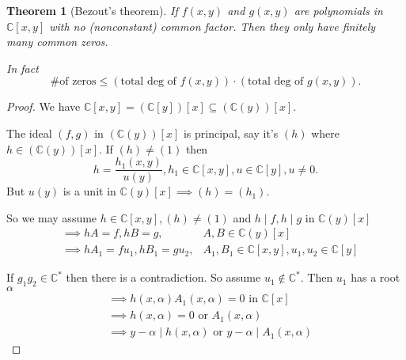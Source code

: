 \documentclass{article}
\newcommand{\C}{\mathbb{C}}
\newtheorem*{theorem}{Theorem}
\theoremstyle{definition}
\theoremstyle{remark}
\begin{document}
\begin{theorem}[Bezout's theorem]
    If $f(x, y)$ and $g(x, y)$ are polynomials in $\C[x, y]$ with no (nonconstant) common factor. Then they only have finitely many common zeros.

    In fact \[\# \text{of zeros} \leq (\text{total deg of } f(x, y)) \cdot (\text{total deg of } g(x, y)).\]
\end{theorem}
\begin{proof}
    We have $\C[x, y] = (\C[y])[x] \subseteq (\C(y))[x]$.\

    The ideal $(f, g)$ in $(\C(y))[x]$ is principal, say it's $(h)$ where $h \in (\C(y))[x]$. If $(h) \neq (1)$ then \[h = \frac{h_1(x, y)}{u(y)}, h_1 \in \C[x, y], u \in \C[y], u \neq 0.\]
    But $u(y)$ is a unit in $\C(y)[x] \implies (h) = (h_1)$.

    So we may assume $h \in \C[x, y], (h) \neq (1)$ and $h \mid f, h \mid g$ in $\C(y)[x]$
    \begin{align*}
        & \implies hA = f, hB = g, & A, B \in \C(y)[x] \\
        & \implies hA_1 = fu_1, hB_1 = gu_2, & A_1, B_1 \in \C[x, y], u_1, u_2 \in \C[y]
    \end{align*}

    If $g_1g_2 \in \C^*$ then there is a contradiction. So assume $u_1 \notin \C^*$. Then $u_1$ has a root $\alpha$
    \begin{align*}
        & \implies h(x, \alpha)A_1(x, \alpha) = 0 \text{ in } \C[x] \\
        & \implies h(x, \alpha) = 0 \text{ or } A_1(x, \alpha) \\
        & \implies y - \alpha \mid h(x, \alpha) \text{ or } y - \alpha \mid A_1(x, \alpha) 
    \end{align*}
    
\end{proof}
\end{document}
